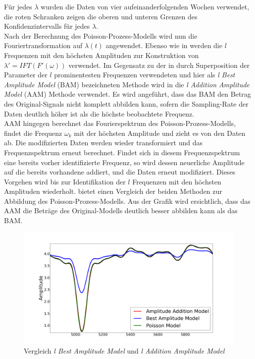 Für jedes $\lambda$ wurden die Daten von vier aufeinanderfolgenden Wochen verwendet, die roten Schranken zeigen die oberen und unteren Grenzen des Konfidenzintervalls für jedes $\lambda$. \\
Nach der Berechnung des Poisson-Prozess-Modells wird nun die Fouriertransformation auf $\lambda (t)$ angewendet. Ebenso wie in \cite{Krajnik.2014} werden die $l$ Frequenzen mit den höchsten Amplituden zur Konstruktion von $\lambda' = IFT(F'(\omega))$ verwendet. Im Gegensatz zu der in \cite{Krajnik.2014} durch Superposition der Parameter der $l$ prominentesten Frequenzen verwendeten und hier als \emph{l Best Amplitude Model} (BAM) bezeichneten Methode wird in \cite{Jovan.2016} die \emph{l Addition Amplitude Model} (AAM) Methode verwendet. Es wird angeführt, dass das BAM den Betrag des Original-Signals nicht komplett abbilden kann, sofern die Sampling-Rate der Daten deutlich höher ist als die höchste beobachtete Frequenz. \\ AAM hingegen berechnet das Fourierspektrum des Poisson-Prozess-Modells, findet die Frequenz $\omega_k$ mit der höchsten Amplitude und zieht es von den Daten ab. Die modifizierten Daten werden wieder transformiert und das Frequenzspektrum erneut berechnet. Findet sich in diesem Frequenzspektrum eine bereits vorher identifizierte Frequenz, so wird dessen neuerliche Amplitude auf die bereits vorhandene addiert, und die Daten erneut modifiziert. Dieses Vorgehen wird bis zur Identifikation der $l$ Frequenzen mit den höchsten Amplituden wiederholt.  bietet einen Vergleich der beiden Methoden zur Abbildung des Poisson-Prozess-Modells. Aus der Grafik wird ersichtlich, dass das AAM die Beträge des Original-Modells deutlich besser abbilden kann als das BAM.

\begin{figure}[!ht]
	\centering
	\includegraphics[width=0.8\linewidth]{Abbildungen/stand_der_technik/BAM_AAM}
	\caption{Vergleich \emph{l Best Amplitude Model} und \emph{l Addition Amplitude Model} \, \cite{Jovan.2016}}
	\label{fig.BAM_AAM_Vergleich}
\end{figure}


